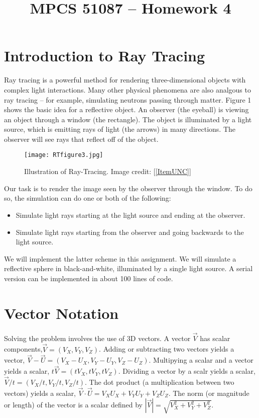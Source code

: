 \documentclass{article}
\title{MPCS 51087 -- Homework 4}
\begin{document}
\maketitle

\section{Introduction to Ray Tracing}

Ray tracing is a powerful method for rendering three-dimensional objects with
complex light interactions.  Many other physical phenomena are also analgous to
ray tracing -- for example, simulating neutrons passing through matter.  Figure
1 shows the basic idea for a reflective object.  An observer (the
eyeball) is viewing an object through a window (the rectangle).  The object is
illuminated by a light source, which is emitting rays of light (the arrows) in
many directions.  The observer will see rays that reflect off of the object.

\begin{figure}
  \label{FigBasic}
  \centering
  \texttt{[image: RTfigure3.jpg]}
  \caption{Illustration of Ray-Tracing.  Image credit: [\ref{ItemUNC}]}
\end{figure}

Our task is to render the image seen by the observer through the window. To do
so, the simulation can do one or both of the following:
\begin{itemize}
  \item Simulate light rays starting at the light source and ending at the observer.
  \item Simulate light rays starting from the observer and going backwards to the light source.
\end{itemize}

We will implement the latter scheme in this assignment.  We will simulate a
reflective sphere in black-and-white, illuminated by a single light source.  A
serial version can be implemented in about 100 lines of code.

\section{Vector Notation}

Solving the problem involves the use of 3D vectors.  A vector $\vec V$ has
scalar components,$\vec V = \left(V_X, V_Y, V_Z\right)$. Adding or subtracting
two vectors yields a vector, $\vec V - \vec U = (V_X - U_X, V_Y-U_Y, V_Z-U_Z)$.
Multipying a scalar and a vector yields a scalar, $t  \vec V = \left(tV_X,
tV_Y, tV_Z\right)$.  Dividing a vector by a scalr yields a scalar, $\vec V / t
= (V_X/t, V_Y/t, V_Z/t)$. The dot product (a multiplication between two
vectors) yields a scalar, $\vec V \cdot \vec U = V_X U_X + V_Y U_Y + V_Z U_Z$.
The norm (or magnitude or length) of the vector is a scalar defined by $ | \vec
V | = \sqrt{V_X^2 + V_Y^2 + V_Z^2}$.
\end{document}
